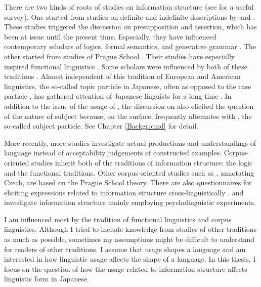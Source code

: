There are two kinds of roots of studies on information structure
(see  for a useful survey).
One started from studies on definite and indefinite descriptions by  and .
These studies triggered the discussion on presupposition and assertion,
which has been at issue until the present time.
Especially, they have influenced contemporary scholars of logics, formal semantics, and generative grammar \cite{chomsky65,jackendoff72,selkirk84,rooth85,rizzi97,erteschik-shir97,erteschik-shir07,buring07,ishihara11,krifkamusan12,endo14}.
The other started from studies of Prague School \cite{mathesius28,mathesius29,sgall67,firbas75}.
Their studies have especially inspired functional linguistics
\cite{bolinger65,halliday67,kuno73,gundel74,chafe76,chafe94,prince81,givon83,tomlin86,lambrecht94,birnerward98,birnerward09}.
Some scholars were influenced by both of these traditions
\cite{vallduvi90,steedman91,vallduvivilkuna98}.
Almost independent of this tradition of European and American linguistics,
the so-called topic particle  in Japanese,
often as opposed to the case particle ,
has gathered attention of Japanese linguists for a long time \cite{matsushita28,yamada36,tokieda50,mikami53,mikami60,onoe81,kinsui95,kikuchi95,noda96,masuoka00,masuoka12}.
In addition to the issue of the usage of ,
the discussion on  also elicited the question of the nature of subject
because, on the surface,  frequently alternates with ,
the so-called subject particle.
See Chapter \ref{Background} for detail.

More recently,
more studies investigate actual productions and understandings of language instead of acceptability judgements of constructed examples.
Corpus-oriented studies  
\cite[e.g.,][]{calhounetal05,gotzeetal07,chiarcosetal11}
inherit both of the traditions of information structure:
the logic and the functional traditions.
Other corpus-oriented studies such as ,
annotating Czech, are based on the Prague School theory.
There are also questionnaires for eliciting expressions related to information structure cross-linguistically \cite{skopeteasetal06}.
 and  investigate information structure mainly employing psycholinguistic experiments.

I am influenced most by the tradition of functional linguistics and corpus linguistics.
Although I tried to include knowledge from studies of other traditions as much as possible,
sometimes my assumptions might be difficult to understand for readers of other traditions.
I assume that usage shapes a language \cite{givon76,comrie83,comrie89,bybeehopper01} and
am interested in how linguistic usage affects the shape of a language.
In this thesis,
I focus on the question of how the usage related to information structure affects linguistic form in Japanese.


